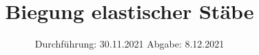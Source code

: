

\subject{V103}
\title{Biegung elastischer Stäbe}
\date{%
  Durchführung: 30.11.2021
  \hspace{3em}
  Abgabe: 8.12.2021
}



\maketitle
\thispagestyle{empty}
\tableofcontents
\newpage






\printbibliography{}
\appendix


